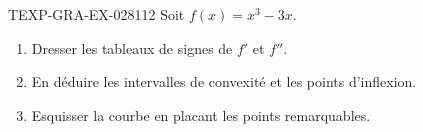 \begin{exercice}{TEXP-GRA-EX-028}{1}{12}
Soit $f(x) = x^3 - 3x$.
\begin{enumerate}
  \item Dresser les tableaux de signes de $f'$ et $f''$.
  \item En déduire les intervalles de convexité et les points d'inflexion.
  \item Esquisser la courbe en placant les points remarquables.
\end{enumerate}

\end{exercice}
